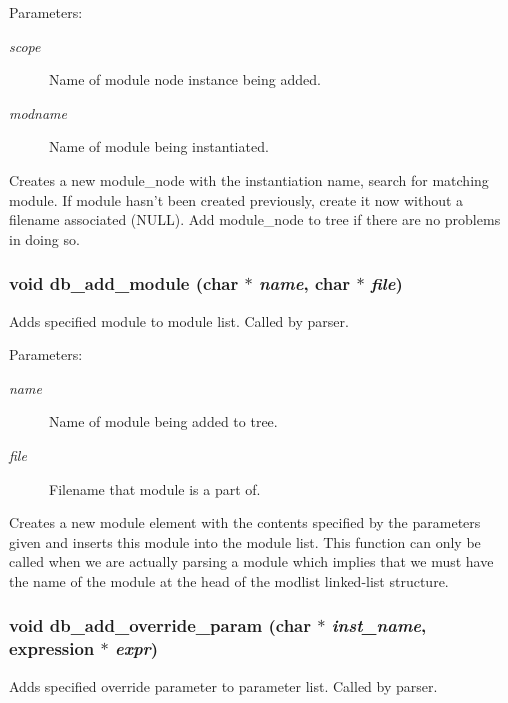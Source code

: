 \begin{Desc}
\item[Parameters:]
\begin{description}
\item[{\em scope}]Name of module node instance being added. \item[{\em modname}]Name of module being instantiated.\end{description}
\end{Desc}
Creates a new module\_\-node with the instantiation name, search for matching module. If module hasn't been created previously, create it now without a filename associated (NULL). Add module\_\-node to tree if there are no problems in doing so. 
\subsubsection{\setlength{\rightskip}{0pt plus 5cm}void db\_\-add\_\-module (char $\ast$ {\em name}, char $\ast$ {\em file})}\label{db_8h_a3}


Adds specified module to module list. Called by parser. 

\begin{Desc}
\item[Parameters:]
\begin{description}
\item[{\em name}]Name of module being added to tree. \item[{\em file}]Filename that module is a part of.\end{description}
\end{Desc}
Creates a new module element with the contents specified by the parameters given and inserts this module into the module list. This function can only be called when we are actually parsing a module which implies that we must have the name of the module at the head of the modlist linked-list structure. 
\subsubsection{\setlength{\rightskip}{0pt plus 5cm}void db\_\-add\_\-override\_\-param (char $\ast$ {\em inst\_\-name}, {\bf expression} $\ast$ {\em expr})}\label{db_8h_a5}


Adds specified override parameter to parameter list. Called by parser. 

